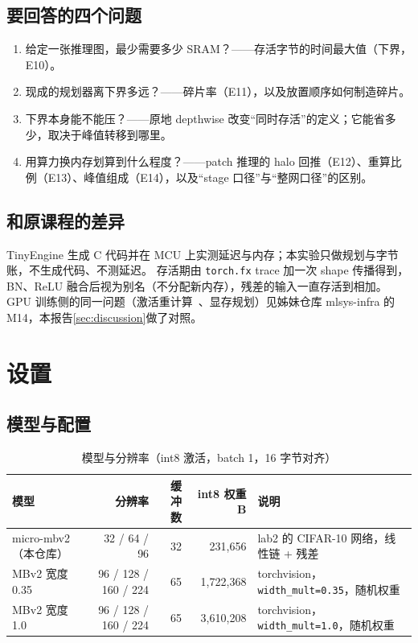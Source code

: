 \documentclass[11pt,a4paper]{ctexart}
\begin{document}
\subsection{要回答的四个问题}
\begin{enumerate}
  \item 给定一张推理图，最少需要多少 SRAM？——存活字节的时间最大值（下界，E10）。
  \item 现成的规划器离下界多远？——碎片率（E11），以及放置顺序如何制造碎片。
  \item 下界本身能不能压？——原地 depthwise 改变“同时存活”的定义；它能省多少，取决于峰值转移到哪里。
  \item 用算力换内存划算到什么程度？——patch 推理的 halo 回推（E12）、重算比例（E13）、峰值组成（E14），以及“stage 口径”与“整网口径”的区别。
\end{enumerate}

\subsection{和原课程的差异}
TinyEngine 生成 C 代码并在 MCU 上实测延迟与内存；本实验只做规划与字节账，不生成代码、不测延迟。
存活期由 \texttt{torch.fx} trace 加一次 shape 传播得到，BN、ReLU 融合后视为别名（不分配新内存），残差的输入一直存活到相加。
GPU 训练侧的同一问题（激活重计算~\cite{chen2016}、显存规划）见姊妹仓库 mlsys-infra 的 M14，本报告\cref{sec:discussion}做了对照。

\section{设置}

\subsection{模型与配置}

\begin{table}[H]
\centering\small
\caption{模型与分辨率（int8 激活，batch 1，16 字节对齐）}\label{tab:models}
\begin{tabularx}{\linewidth}{l r r r >{\raggedright\arraybackslash}X}
\toprule
模型 & 分辨率 & 缓冲数 & int8 权重 B & 说明 \\
\midrule
micro-mbv2（本仓库） & 32 / 64 / 96 & 32 & 231,656 & lab2 的 CIFAR-10 网络，线性链 + 残差 \\
MBv2 宽度 0.35 & 96 / 128 / 160 / 224 & 65 & 1,722,368 & torchvision，\texttt{width\_mult=0.35}，随机权重 \\
MBv2 宽度 1.0 & 96 / 128 / 160 / 224 & 65 & 3,610,208 & torchvision，\texttt{width\_mult=1.0}，随机权重 \\
\bottomrule
\end{tabularx}
\end{table}
\end{document}
